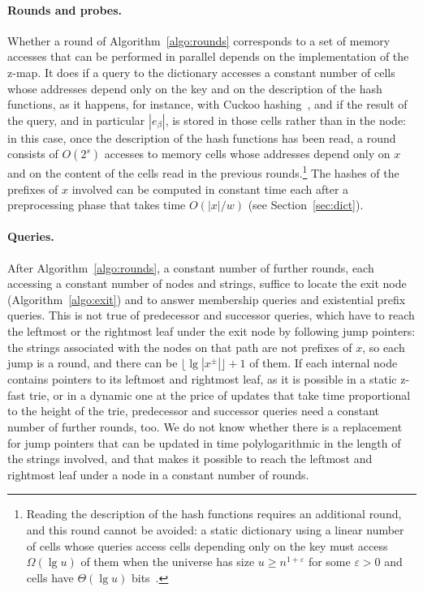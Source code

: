 \documentclass[a4paper]{article}
\newcommand{\?}{\mskip1.5mu}
\renewcommand{\epsilon}{\varepsilon}
\begin{document}
\paragraph{Rounds and probes.} Whether a round of Algorithm~\ref{algo:rounds} corresponds to a set of memory accesses 
that can be performed in parallel depends on the implementation of the z-map. It does if a query to the dictionary accesses a constant number of 
cells whose addresses depend only on the key and on the description of the hash functions, as it happens, 
for instance, with Cuckoo hashing~\cite{PaRCH}, and if the result of the query, and in particular $|e_\beta|$, is stored in those cells rather than in the node:
in this case, once the description of the hash functions has been read, a round consists of $O(2^s)$ accesses to memory cells whose addresses 
depend only on $x$ and on the content of the cells read in the previous rounds.\footnote{Reading the description of the hash functions requires
an additional round, and this round cannot be avoided: a static dictionary using a linear number of cells whose queries access cells depending only on the key 
must access $\Omega(\lg u)$ of them when the universe has size $u\geq n^{1+\epsilon}$ for some $\epsilon>0$ and cells have $\Theta(\lg u)$ bits~\cite{Larsen2024Optimal}.} 
The hashes of the prefixes of $x$ involved can be computed in constant time each after 
a preprocessing phase that takes time $O(|x|/w)$ (see Section~\ref{sec:dict}).

\paragraph{Queries.} After Algorithm~\ref{algo:rounds}, a constant number of further rounds, each accessing a constant number of 
nodes and strings, suffice to locate the exit node (Algorithm~\ref{algo:exit}) and to answer membership queries and existential prefix queries. 
This is not true of predecessor and successor queries, which have to reach the leftmost or the rightmost leaf under the exit node by following jump pointers:
the strings associated with the nodes on that path are not prefixes of $x$, so each jump is a round, and there can be $\lfloor\lg|x^\pm|\rfloor+1$ of them. 
If each internal node contains pointers to its leftmost and rightmost leaf, 
as it is possible in a static z-fast trie, or in a dynamic one at the price of updates that 
take time proportional to the height of the trie, predecessor and successor queries need a constant number of further rounds, too. 
We do not know whether there is a replacement for jump pointers that can be updated in time polylogarithmic in the length of the strings 
involved, and that makes it possible to reach the leftmost and rightmost leaf under a node in a constant number of rounds.
\end{document}
